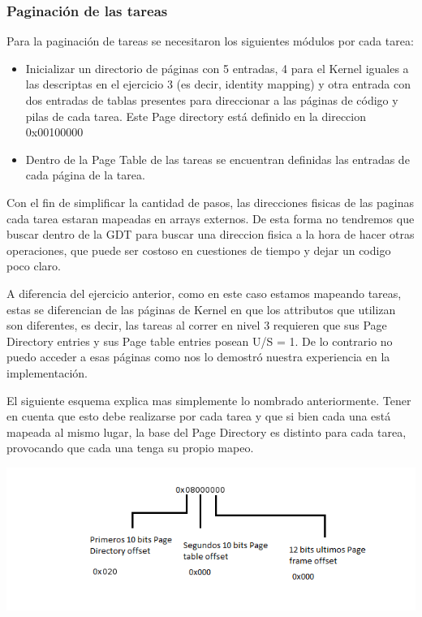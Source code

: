 \subsubsection{Paginaci\'on de las tareas}

Para la paginaci\'on de tareas se necesitaron los siguientes m\'odulos por cada tarea:
\begin{itemize}
 \item Inicializar un directorio de p\'aginas con 5 entradas, 4 para el Kernel iguales a las descriptas en el ejercicio 3 (es decir, identity mapping) 
 y otra entrada con dos entradas de tablas presentes para direccionar a las p\'aginas de c\'odigo y pilas de cada tarea. Este Page directory est\'a definido en la direccion 0x00100000
 \item Dentro de la Page Table de las tareas se encuentran definidas las entradas de cada p\'agina de la tarea. 
\end{itemize}

Con el fin de simplificar la cantidad de pasos, las direcciones fisicas de las paginas cada tarea estaran mapeadas en arrays externos. De esta forma no
tendremos que buscar dentro de la GDT para buscar una direccion fisica a la hora de hacer otras operaciones, que puede ser costoso en cuestiones de tiempo
y dejar un codigo poco claro.

A diferencia del ejercicio anterior, como en este caso estamos mapeando tareas, estas se diferencian de las p\'aginas de Kernel en que
los attributos que utilizan son diferentes, es decir, las tareas al correr en nivel 3 requieren que sus Page Directory entries y sus
Page table entries posean U/S = 1. De lo contrario no puedo acceder a esas p\'aginas como nos lo demostr\'o nuestra experiencia en la
implementaci\'on.

El siguiente esquema explica mas simplemente lo nombrado anteriormente. Tener en cuenta que esto debe realizarse por cada tarea y que si
bien cada una est\'a mapeada al mismo lugar, la base del Page Directory es distinto para cada tarea, provocando que cada una tenga su
propio mapeo. %

\begin{center}
  \includegraphics[scale=0.6]{imagenes/ComoDividoVirtual.png} 
\end{center}

